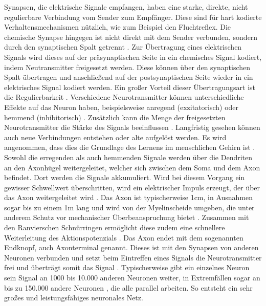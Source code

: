 Synapsen, die elektrische Signale empfangen, haben eine starke, direkte, nicht regulierbare Verbindung vom Sender zum Empfänger. Diese sind für hart kodierte Verhaltensmechanismen nützlich, wie zum Beispiel den Fluchtreflex. Die chemische Synapse hingegen ist nicht direkt mit dem Sender verbunden, sondern durch den synaptischen Spalt getrennt \cite{kriesel2008kleiner}. Zur Übertragung eines elektrischen Signals wird dieses auf der präsynaptischen Seite in ein chemisches Signal kodiert, indem Neutransmitter freigesetzt werden. Diese können über den synaptischen Spalt übertragen und anschließend auf der postsynaptischen Seite wieder in ein elektrisches Signal kodiert werden. Ein großer Vorteil dieser Übertragungsart ist die Regulierbarkeit \cite{kriesel2008kleiner}. Verschiedene Neurotransmitter können unterschiedliche Effekte auf das Neuron haben, beispielsweise anregend (exzitatorisch) oder hemmend (inhibitorisch) \cite{kirschbaum2008biopsychologie}. Zusätzlich kann die Menge der freigesetzten Neurotransmitter die Stärke des Signals beeinflussen \cite{kriesel2008kleiner}. Langfristig gesehen können auch neue Verbindungen entstehen oder alte aufgelöst werden. Es wird angenommen, dass dies die Grundlage des Lernens im menschlichen Gehirn ist \cite{russell2013kunstliche}.\\
Sowohl die erregenden als auch hemmenden Signale werden über die Dendriten an den Axonhügel weitergeleitet, welcher sich zwischen dem Soma und dem Axon befindet. Dort werden die Signale akkumuliert. Wird bei diesem Vorgang ein gewisser Schwellwert überschritten, wird ein elektrischer Impuls erzeugt, der über das Axon weitergeleitet wird \cite{kirschbaum2008biopsychologie}. Das Axon ist typischerweise 1cm, in Ausnahmen sogar bis zu einem 1m lang und wird von der Myelinscheide umgeben, die unter anderem Schutz vor mechanischer Überbeanspruchung bietet \cite{russell2013kunstliche}. Zusammen mit den Ranvierschen Schnürringen  ermöglicht diese zudem eine schnellere Weiterleitung des Aktionspotenzials \cite{kirschbaum2008biopsychologie}. Das Axon endet mit dem sogenannten Endknopf, auch Axonterminal genannt. Dieses ist mit den Synapsen von anderen Neuronen verbunden und setzt beim Eintreffen eines Signals die Neurotransmitter frei und überträgt somit das Signal \cite{kirschbaum2008biopsychologie}. Typischerweise gibt ein einzelnes Neuron sein Signal an 1000 bis 10.000 anderen Neuronen weiter, in Extremfällen sogar an bis zu 150.000 andere Neuronen \cite{zell2003simulation}, die alle parallel arbeiten. So entsteht ein sehr großes und leistungsfähiges neuronales Netz. 


